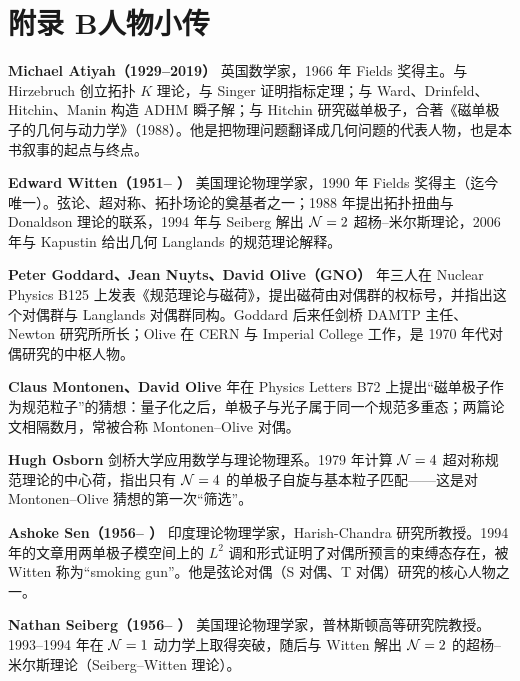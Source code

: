 \section*{附录 B\quad 人物小传}


\vspace{0.6em}

\noindent\textbf{Michael Atiyah（1929--2019）}\quad
英国数学家，1966 年 Fields 奖得主。与 Hirzebruch 创立拓扑 $K$ 理论，与 Singer 证明指标定理；与 Ward、Drinfeld、Hitchin、Manin 构造 ADHM 瞬子解；与 Hitchin 研究磁单极子，合著《磁单极子的几何与动力学》（1988）。他是把物理问题翻译成几何问题的代表人物，也是本书叙事的起点与终点。

\medskip
\noindent\textbf{Edward Witten（1951-- ）}\quad
美国理论物理学家，1990 年 Fields 奖得主（迄今唯一）。弦论、超对称、拓扑场论的奠基者之一；1988 年提出拓扑扭曲与 Donaldson 理论的联系，1994 年与 Seiberg 解出 $\mathcal{N}=2$ 超杨--米尔斯理论，2006 年与 Kapustin 给出几何 Langlands 的规范理论解释。

\medskip
\noindent\textbf{Peter Goddard、Jean Nuyts、David Olive（GNO）} 年三人在 Nuclear Physics B125 上发表《规范理论与磁荷》，提出磁荷由对偶群的权标号，并指出这个对偶群与 Langlands 对偶群同构。Goddard 后来任剑桥 DAMTP 主任、Newton 研究所所长；Olive 在 CERN 与 Imperial College 工作，是 1970 年代对偶研究的中枢人物。

\medskip
\noindent\textbf{Claus Montonen、David Olive} 年在 Physics Letters B72 上提出“磁单极子作为规范粒子”的猜想：量子化之后，单极子与光子属于同一个规范多重态；两篇论文相隔数月，常被合称 Montonen--Olive 对偶。

\medskip
\noindent\textbf{Hugh Osborn}\quad
剑桥大学应用数学与理论物理系。1979 年计算 $\mathcal{N}=4$ 超对称规范理论的中心荷，指出只有 $\mathcal{N}=4$ 的单极子自旋与基本粒子匹配——这是对 Montonen--Olive 猜想的第一次“筛选”。

\medskip
\noindent\textbf{Ashoke Sen（1956-- ）}\quad
印度理论物理学家，Harish-Chandra 研究所教授。1994 年的文章用两单极子模空间上的 $L^2$ 调和形式证明了对偶所预言的束缚态存在，被 Witten 称为“smoking gun”。他是弦论对偶（S 对偶、T 对偶）研究的核心人物之一。

\medskip
\noindent\textbf{Nathan Seiberg（1956-- ）}\quad
美国理论物理学家，普林斯顿高等研究院教授。1993--1994 年在 $\mathcal{N}=1$ 动力学上取得突破，随后与 Witten 解出 $\mathcal{N}=2$ 的超杨--米尔斯理论（Seiberg--Witten 理论）。

